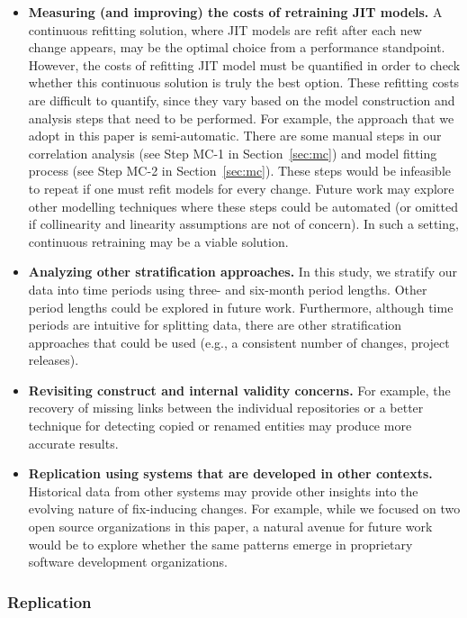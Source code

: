 \begin{itemize}
  \item {\bf Measuring (and improving) the costs of retraining JIT models.}
    A continuous refitting solution, where JIT models are refit after each new change appears, may be the optimal choice from a performance standpoint.
    However, the costs of refitting JIT model must be quantified in order to check whether this continuous solution is truly the best option.
    These refitting costs are difficult to quantify, since they vary based on the model construction and analysis steps that need to be performed.
    For example, the approach that we adopt in this paper is semi-automatic.
    There are some manual steps in our correlation analysis (see Step MC-1 in Section~\ref{sec:mc}) and model fitting process (see Step MC-2 in Section~\ref{sec:mc}).
    These steps would be infeasible to repeat if one must refit models for every change.
    Future work may explore other modelling techniques where these steps could be automated (or omitted if collinearity and linearity assumptions are not of concern).
    In such a setting, continuous retraining may be a viable solution.

  \item {\bf Analyzing other stratification approaches.}
  In this study, we stratify our data into time periods using three- and six-month period lengths.
  Other period lengths could be explored in future work.
  Furthermore, although time periods are intuitive for splitting data, there are other stratification approaches that could be used (e.g., a consistent number of changes, project releases).

  \item {\bf Revisiting construct and internal validity concerns.}
    For example, the recovery of missing links between the individual repositories or a better technique for detecting copied or renamed entities may produce more accurate results.

  \item {\bf Replication using systems that are developed in other contexts.}
    Historical data from other systems may provide other insights into the evolving nature of fix-inducing changes.
    For example, while we focused on two open source organizations in this paper, a natural avenue for future work would be to explore whether the same patterns emerge in proprietary software development organizations.
\end{itemize}

\subsubsection*{Replication}

